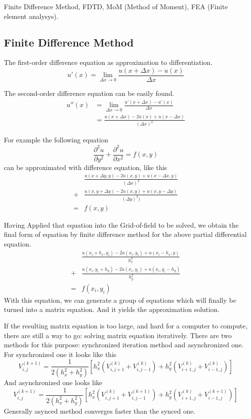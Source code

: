 
Finite Difference Method, FDTD, MoM (Method of Moment), FEA (Finite element analysys).

\subsection{Finite Difference Method}

The first-order difference equation as approximation to differentiation.
$$
  u'(x) = \lim_{\Delta x \rightarrow 0} \frac{u(x+\Delta x)-u(x)}{\Delta x}
$$

The second-order difference equation can be easily found.
\begin{align*}
  u''(x) &= \lim_{\Delta x \rightarrow 0} \frac{u'(x+\Delta x)-u'(x)}{\Delta x} \\
  &= \frac{u(x+\Delta x)-2u(x)+u(x-\Delta x)}{(\Delta x)^2}
\end{align*}

For example the following equation
$$
  \frac{\partial^2 u}{\partial y^2} + \frac{\partial^2 u}{\partial x^2} = f(x,y)
$$
can be approximated with difference equation, like this
\begin{align*}
  &\frac{u(x+\Delta y, y) - 2u(x,y) + u(x-\Delta x, y)}{(\Delta x)^2}\\
  +& \frac{u(x, y+\Delta y) - 2u(x,y) + u(x, y-\Delta y)}{(\Delta y)^2)}\\
  =& f(x, y)
\end{align*}

Having Applied that equation into the Grid-of-field to be solved, we obtain the final form
of equation by finite difference method for the above partial differential equation.
\begin{align*}
  &\frac{u(x_i+h_x, y_i) - 2u(x_i,y_i) + u(x_i-h_x, y)}{h_x^2}\\
  +& \frac{u(x_i, y_i+h_y) - 2u(x_i,y_i) + u(x_i, y_i-h_y)}{h_y^2}\\
  =& f(x_i, y_i)
\end{align*}
With this equation, we can generate a group of equations which will finally be turned into
a matrix equation. And it yields the approximation solution.

If the resulting matrix equation is too large, and hard for a computer to
compute, there are still a way to go: solving matrix equation iteratively.
There are two methods for this purpose: synchronized iteration method and
asynchronized one. For synchronized one it looks like this
$$
V_{i,j}^{(k+1)} = \frac{1}{2(h_x^2+h_y^2)}
  [ h_x^2(V_{i,j+1}^{(k)} +V_{i,j-1}^{(k)}) 
    + h_y^2(V_{i+1,j}^{(k)} +V_{i-1,j}^{(k)}) ]
$$
And asynchronized one looks like
$$
V_{i,j}^{(k+1)} = \frac{1}{2(h_x^2+h_y^2)}
  [ h_x^2(V_{i,j+1}^{(k)} +V_{i,j-1}^{(k+1)}) 
    + h_y^2(V_{i+1,j}^{(k)} +V_{i-1,j}^{(k+1)}) ]
$$
Generally asynced method converges faster than the synced one.



